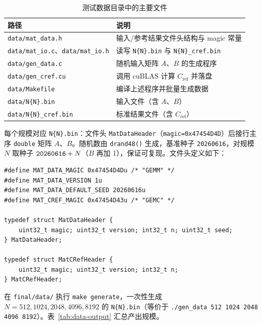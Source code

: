 \documentclass[zihao=-4]{ctexart}
\begin{document}
\begin{spacing}{1.5}
\begin{table}[H]
\small
\centering
\caption{测试数据目录中的主要文件}
\label{tab:data-files}
\begin{tabular}{P{4.5cm}P{8.3cm}}
\toprule
路径 & 说明 \\
\midrule
\protect\texttt{data/mat\_data.h} & 输入/参考结果文件头结构与 magic 常量 \\
\protect\texttt{data/mat\_io.c}、\protect\texttt{data/mat\_io.h} & 读写 \protect\texttt{N\{N\}.bin} 与 \protect\texttt{N\{N\}\_cref.bin} \\
\protect\texttt{data/gen\_data.c} & 随机输入矩阵 $A$、$B$ 的生成程序 \\
\protect\texttt{data/gen\_cref.cu} & 调用 cuBLAS 计算 $C_{\mathrm{ref}}$ 并落盘 \\
\protect\texttt{data/Makefile} & 编译上述程序并批量生成数据 \\
\protect\texttt{data/N\{N\}.bin} & 输入文件（含 $A$、$B$） \\
\protect\texttt{data/N\{N\}\_cref.bin} & 标准结果文件（含 $C_{\mathrm{ref}}$） \\
\bottomrule
\end{tabular}
\end{table}

每个规模对应 \protect\texttt{N\{N\}.bin}：文件头 \protect\texttt{MatDataHeader}（\protect\texttt{magic=0x47454D4D}）后接行主序 \protect\texttt{double} 矩阵 $A$、$B$。随机数由 \protect\texttt{drand48()} 生成，基准种子 \protect\texttt{20260616}，对规模 $N$ 取种子 $\protect\texttt{20260616}+N$（$B$ 再加 1），保证可复现。文件头定义如下：

\begin{lstlisting}[caption={输入/参考结果文件头（\protect\texttt{mat\_data.h}）}]
#define MAT_DATA_MAGIC 0x47454D4Du /* "GEMM" */
#define MAT_DATA_VERSION 1u
#define MAT_DATA_DEFAULT_SEED 20260616u
#define MAT_CREF_MAGIC 0x47454D43u /* "GEMC" */

typedef struct MatDataHeader {
    uint32_t magic; uint32_t version; int32_t n; uint32_t seed;
} MatDataHeader;

typedef struct MatCRefHeader {
    uint32_t magic; uint32_t version; int32_t n;
} MatCRefHeader;
\end{lstlisting}

在 \protect\texttt{final/data/} 执行 \protect\texttt{make generate}，一次性生成 $N=512,1024,2048,4096,8192$ 的 \protect\texttt{N\{N\}.bin}（等价于 \protect\texttt{./gen\_data 512 1024 2048 4096 8192}）。表~\ref{tab:data-output} 汇总产出规模。


\end{spacing}
\end{document}

